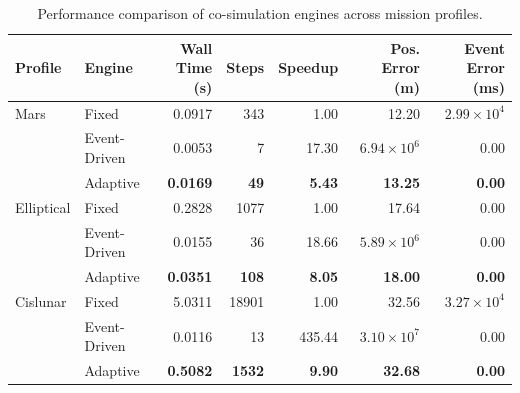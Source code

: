 \documentclass[a4paper,fleqn]{cas-sc}
\begin{document}
\begin{table}[htbp]
\centering
\caption{Performance comparison of co-simulation engines across mission profiles.}
\label{tab:comparison}
\footnotesize
\begin{tabular}{llrrrrr}
\toprule
\textbf{Profile} & \textbf{Engine} & \textbf{Wall Time (s)} & \textbf{Steps} & \textbf{Speedup} & \textbf{Pos. Error (m)} & \textbf{Event Error (ms)} \\
\midrule
Mars & Fixed & \textcolor{revcolor}{0.0917} & \textcolor{revcolor}{343} & \textcolor{revcolor}{1.00} & \textcolor{revcolor}{12.20} & \textcolor{revcolor}{$2.99 \times 10^4$} \\
 & Event-Driven & \textcolor{revcolor}{0.0053} & \textcolor{revcolor}{7} & \textcolor{revcolor}{17.30} & \textcolor{revcolor}{$6.94 \times 10^6$} & \textcolor{revcolor}{0.00} \\
 & Adaptive & \textcolor{revcolor}{\textbf{0.0169}} & \textcolor{revcolor}{\textbf{49}} & \textcolor{revcolor}{\textbf{5.43}} & \textcolor{revcolor}{\textbf{13.25}} & \textcolor{revcolor}{\textbf{0.00}} \\
\midrule
Elliptical & Fixed & \textcolor{revcolor}{0.2828} & \textcolor{revcolor}{1077} & \textcolor{revcolor}{1.00} & \textcolor{revcolor}{17.64} & \textcolor{revcolor}{0.00} \\
 & Event-Driven & \textcolor{revcolor}{0.0155} & \textcolor{revcolor}{36} & \textcolor{revcolor}{18.66} & \textcolor{revcolor}{$5.89 \times 10^6$} & \textcolor{revcolor}{0.00} \\
 & Adaptive & \textcolor{revcolor}{\textbf{0.0351}} & \textcolor{revcolor}{\textbf{108}} & \textcolor{revcolor}{\textbf{8.05}} & \textcolor{revcolor}{\textbf{18.00}} & \textcolor{revcolor}{\textbf{0.00}} \\
\midrule
Cislunar & Fixed & \textcolor{revcolor}{5.0311} & \textcolor{revcolor}{18901} & \textcolor{revcolor}{1.00} & \textcolor{revcolor}{32.56} & \textcolor{revcolor}{$3.27 \times 10^4$} \\
 & Event-Driven & \textcolor{revcolor}{0.0116} & \textcolor{revcolor}{13} & \textcolor{revcolor}{435.44} & \textcolor{revcolor}{$3.10 \times 10^7$} & \textcolor{revcolor}{0.00} \\
 & Adaptive & \textcolor{revcolor}{\textbf{0.5082}} & \textcolor{revcolor}{\textbf{1532}} & \textcolor{revcolor}{\textbf{9.90}} & \textcolor{revcolor}{\textbf{32.68}} & \textcolor{revcolor}{\textbf{0.00}} \\
\bottomrule
\end{tabular}
\end{table}
\end{document}
